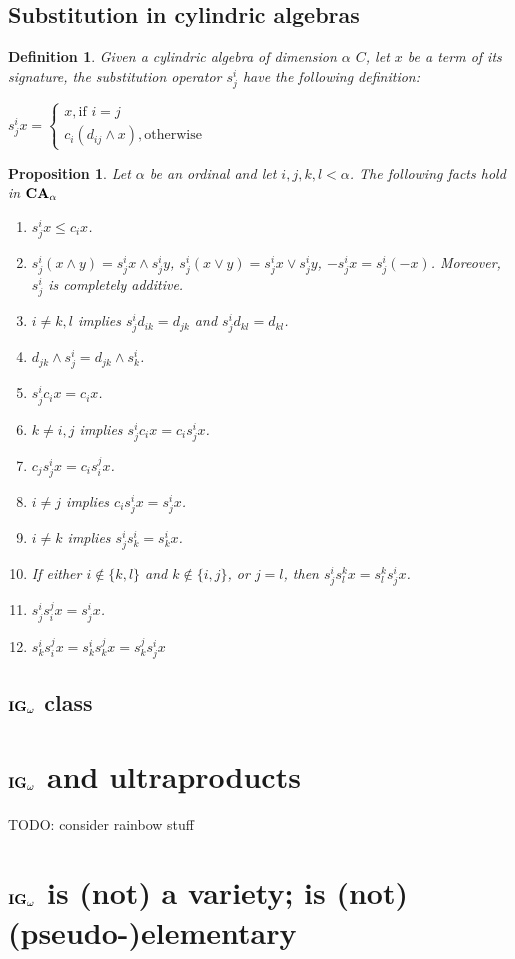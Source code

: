 \documentclass[a4paper]{article}
\theoremstyle{defin}
\newtheorem{defin}{Definition}
\theoremstyle{theorem}
\theoremstyle{prop}
\newtheorem{prop}{Proposition}
\theoremstyle{lemma}
\theoremstyle{ex}
\theoremstyle{col}
\begin{document}
\subsection{Substitution in cylindric algebras}

\begin{defin}
  Given a cylindric algebra of dimension $\alpha$ $C$, let $x$ be a term of its signature, the substitution operator $s^{i}_{j}$ have the following definition:
  \begin{center}
  $s^{i}_{j} x = \begin{cases} x, \text{if } i = j \\ c_i (d_{ij} \land x), \text{otherwise} \end{cases}$
  \end{center}
\end{defin}

\begin{prop} Let $\alpha$ be an ordinal and let $i, j, k, l < \alpha$. The following facts hold in ${\bf CA}_{\alpha}$

  \begin{enumerate}
    \item $s^{i}_j x \leq c_i x$.
    \item $s^{i}_j (x \land y) = s^{i}_j x \land s^{i}_j y$, $s^{i}_j (x \lor y) = s^{i}_j x \lor s^{i}_j y$, $- s^{i}_j x = s^{i}_j (- x)$.
    Moreover, $s^{i}_j$ is completely additive.
    \item $i \neq k, l$ implies $s^i_j d_{ik} = d_{jk}$ and $s^i_j d_{kl} = d_{kl}$.
    \item $d_{jk} \land s^{i}_j = d_{jk} \land s^{i}_k$.
    \item $s^i_j c_i x = c_i x$.
    \item $k \neq i,j$ implies $s^i_j c_i x = c_i s^i_j x$.
    \item $c_j s^i_j x = c_i s^j_i x$.
    \item $i \neq j$ implies $c_i s^i_j x = s^i_j x$.
    \item $i \neq k$ implies $s^i_j s^i_k = s^i_k x$.
    \item If either $i \notin \{ k, l\}$ and $k \notin \{ i, j\}$, or $j = l$, then $s^i_j s^k_l x = s^k_l s^i_j x$.
    \item $s^i_j s^j_i x = s^i_j x$.
    \item $s^i_k s^j_i x = s^i_k s^j_k x = s^j_k s^i_j x$
  \end{enumerate}
\end{prop}

\subsection{${\bf IG}_{\omega}$ class}



\section{${\bf IG}_{\omega}$ and ultraproducts}

TODO: consider rainbow stuff

\section{${\bf IG}_{\omega}$ is (not) a variety; is (not) (pseudo-)elementary}



\end{document}
